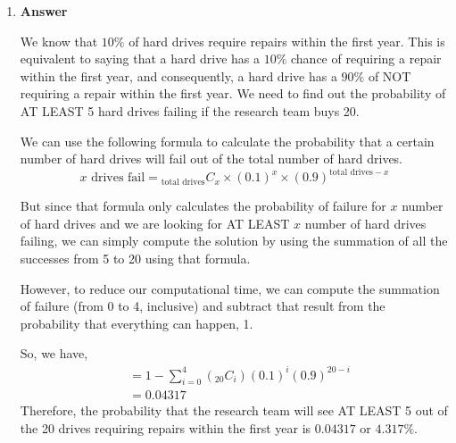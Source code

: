 \documentclass[12pt]{book}
\begin{document}
\begin{enumerate}
\begin{enumerate}
        
        
    \end{enumerate}
    
    
    \item \textbf{Answer}
    
    We know that $10\%$ of hard drives require repairs within the first year. This is equivalent to saying that a hard drive has a $10\%$ chance of requiring a repair within the first year, and consequently, a hard drive has a $90\%$ of NOT requiring a repair within the first year. We need to find out the probability of AT LEAST 5 hard drives failing if the research team buys 20.
    
    We can use the following formula to calculate the probability that a certain number of hard drives will fail out of the total number of hard drives.
    $$x\text{ drives fail} = {}_{\text{total drives}} C_{x} \times (0.1)^x \times (0.9)^{\text{total drives} - x}$$
    
    But since that formula only calculates the probability of failure for $x$ number of hard drives and we are looking for AT LEAST $x$ number of hard drives failing, we can simply compute the solution by using the summation of all the successes from 5 to 20 using that formula. 
    
    However, to reduce our computational time, we can compute the summation of failure (from 0 to 4, inclusive) and subtract that result from the probability that everything can happen, 1.
    
    So, we have,
    \begin{align*}
        &= 1 - \sum_{i=0}^{4} \left({}_{20}C_{i}\right)(0.1)^i(0.9)^{20-i}\\
        &= 0.04317
    \end{align*}
    Therefore, the probability that the research team will see AT LEAST 5 out of the 20 drives requiring repairs within the first year is $0.04317$ or $4.317\%$.
    
    
    

\end{enumerate}
\end{document}
